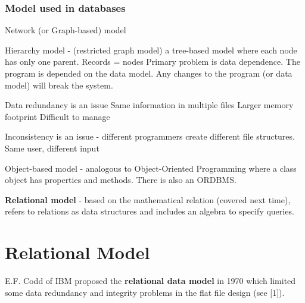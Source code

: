 \documentclass{article}
\newtheorem{example}{Example}
\begin{document}
\subsubsection*{Model used in databases}
\begin{outline}
    
        \1 Network (or Graph-based) model

        \1 Hierarchy model - (restricted graph model) a tree-based model where each node has only one parent.  Records = nodes
                \2 Primary problem is data dependence.  The program is depended on the data model.  Any changes to the program (or data model) will break the system.

                \2 Data redundancy is an issue
                        \3 Same information in multiple files
                                \4  Larger memory footprint
                                \4 Difficult to manage
                
                \2 Inconsistency is an issue - different programmers create different file structures. 
                        \3 Same user, different input %
    
    \1 Object-based model -
analogous to Object-Oriented Programming where a class object has properties and methods.  There is also an ORDBMS.      
    
    
    \1 \textbf{Relational model} - based on the mathematical relation (covered next time), refers to relations as data structures and includes an algebra to specify queries.
\end{outline}











\section{Relational Model}
E.F. Codd of IBM proposed the \textbf{relational data model} in 1970 which limited some data redundancy and integrity problems in the flat file design (see [1]).\\%
\end{document}
